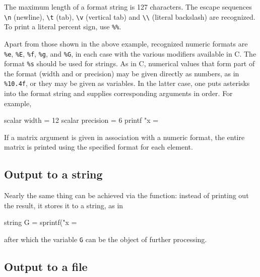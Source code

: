 The maximum length of a format string is 127 characters. The escape
sequences \verb|\n| (newline), \verb|\t| (tab), \verb|\v| (vertical
tab) and \verb|\\| (literal backslash) are recognized. To print a
literal percent sign, use \verb|%%|.

Apart from those shown in the above example, recognized numeric
formats are \verb|%e|, \verb|%E|, \verb|%f|, \verb|%g|, and \verb|%G|,
in each case with the various modifiers available in C. The format
\verb|%s| should be used for strings. As in C, numerical values that
form part of the format (width and or precision) may be given directly
as numbers, as in \verb|%10.4f|, or they may be given as variables. In
the latter case, one puts asterisks into the format string and
supplies corresponding arguments in order. For example,

\begin{code}
  scalar width = 12 
  scalar precision = 6 
  printf "x = %
\end{code}

If a matrix argument is given in association with a numeric format,
the entire matrix is printed using the specified format for each
element. 

\subsection{Output to a string}
\label{sec:sprintf}

Nearly the same thing can be achieved via the  function:
instead of printing out the result, it stores it to a string, as in 
\begin{code}
  string G = sprintf("x = %
\end{code}
after which the variable \texttt{G} can be the object of further
processing.


\subsection{Output to a file}
\label{sec:outfile}


